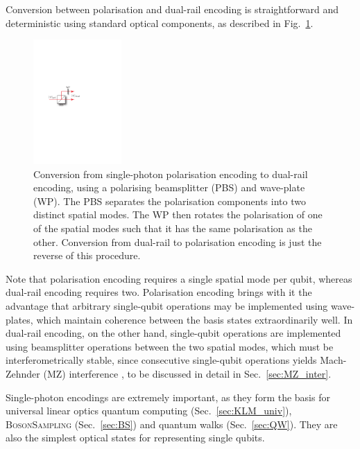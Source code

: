 Conversion between polarisation and dual-rail encoding is straightforward and deterministic using standard optical components, as described in Fig.~\ref{fig:pol_to_dual_conv}.

\begin{figure}[!htbp]
\includegraphics[clip=true, width=0.3\textwidth]{pol_to_dual_conversion}
\captionspacefig \caption{Conversion from single-photon polarisation encoding to dual-rail encoding, using a polarising beamsplitter (PBS) and wave-plate (WP). The PBS separates the polarisation components into two distinct spatial modes. The WP then rotates the polarisation of one of the spatial modes such that it has the same polarisation as the other. Conversion from dual-rail to polarisation encoding is just the reverse of this procedure.} \label{fig:pol_to_dual_conv}
\end{figure}

Note that polarisation encoding requires a single spatial mode per qubit, whereas dual-rail encoding requires two. Polarisation encoding brings with it the advantage that arbitrary single-qubit operations may be implemented using wave-plates, which maintain coherence between the basis states extraordinarily well. In dual-rail encoding, on the other hand, single-qubit operations are implemented using beamsplitter operations between the two spatial modes, which must be interferometrically stable, since consecutive single-qubit operations yields Mach-Zehnder (MZ) interference \cite{bib:Zehnder1, bib:Zehnder2}, to be discussed in detail in Sec.~\ref{sec:MZ_inter}.

Single-photon encodings are extremely important, as they form the basis for universal linear optics quantum computing (Sec.~\ref{sec:KLM_univ}), \textsc{BosonSampling} (Sec.~\ref{sec:BS}) and quantum walks (Sec.~\ref{sec:QW}). They are also the simplest optical states for representing single qubits.

